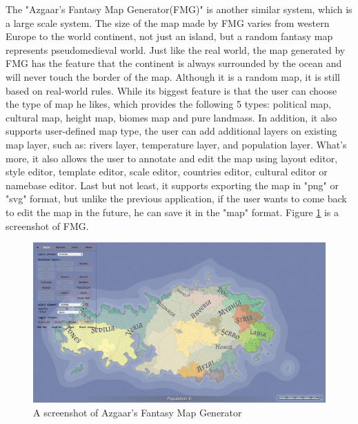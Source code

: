 The "Azgaar's Fantasy Map Generator(FMG)" is another similar system, which is a large scale system. The size of the map made by FMG varies from western Europe to the world continent, not just an island, but a random fantasy map represents pseudomedieval world.
Just like the real world, the map generated by FMG has the feature that the continent is always surrounded by the ocean and will never touch the border of the map. Although it is a random map, it is still based on real-world rules. While its biggest feature is that the user can choose the type of map he likes, which provides the following 5 types: political map, cultural map, height map, biomes map and pure landmass. In addition, it also supports user-defined map type, the user can add additional layers on existing map layer, such as: rivers layer, temperature layer, and population layer. What's more, it also allows the user to annotate and edit the map using layout editor, style editor, template editor, scale editor, countries editor, cultural editor or namebase editor. Last but not least, it supports exporting the map in "png" or "svg" format, but unlike the previous application, if the user wants to come back to edit the map in the future, he can save it in the "map" format. Figure \ref{Sample Map 1} is a screenshot of FMG.

\begin{figure}[htb]
\centering
\includegraphics[width=.9\textwidth]{section01/assets/screenshot_FMG.png}
\caption[A screenshot of Azgaar's Fantasy Map Generator]{\label{Sample Map 1}A screenshot of Azgaar's Fantasy Map Generator}
\end{figure}

